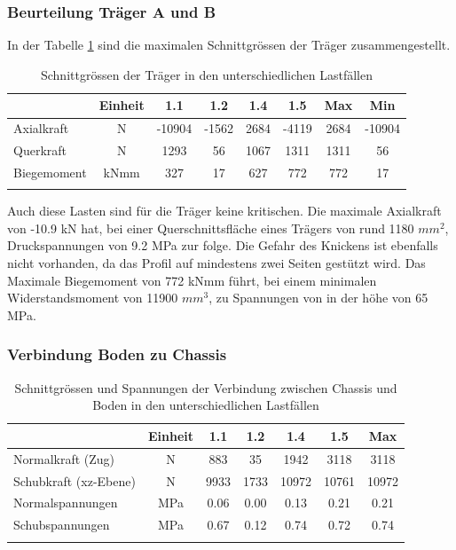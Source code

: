 \subsubsection{Beurteilung Träger A und B}
In der Tabelle \ref{tab:FEMres Träger} sind die maximalen Schnittgrössen der Träger zusammengestellt.
\begin{table}[H]
\centering
\begin{tabular}{lccccccc}
\thickhline
&	Einheit	&	1.1	&	1.2	&	1.4	&	1.5	&	Max	&	Min	\\	\hline
Axialkraft	&	N	&	-10904	&	-1562	&	2684	&	-4119	&	2684	&	-10904	\\
Querkraft	&	N	&	1293	&	56	&	1067	&	1311	&	1311	&	56	\\
Biegemoment	&	kNmm	&	327	&	17	&	627	&	772	&	772	&	17	\\	\thickhline
\end{tabular}
\caption{Schnittgrössen der Träger in den unterschiedlichen Lastfällen}
\label{tab:FEMres Träger}
\end{table}

Auch diese Lasten sind für die Träger keine kritischen. Die maximale Axialkraft von -10.9 kN hat, bei einer Querschnittsfläche eines Trägers von rund 1180 $mm^2$, Druckspannungen von 9.2 MPa zur folge. Die Gefahr des Knickens ist ebenfalls nicht vorhanden, da das Profil auf mindestens zwei Seiten gestützt wird. Das Maximale Biegemoment von 772 kNmm führt, bei einem minimalen Widerstandsmoment von 11900 $mm^3$, zu Spannungen von in der höhe von 65 MPa.



\subsubsection{Verbindung Boden zu Chassis}

\begin{table}[H]
\centering
\begin{tabular}{lcccccc}
\thickhline
&	Einheit	&	1.1	&	1.2	&	1.4	&	1.5	&	Max	\\	\hline
Normalkraft (Zug)	&	N	&	883	&	35	&	1942	&	3118	&	3118	\\
Schubkraft (xz-Ebene)	&	N	&	9933	&	1733	&	10972	&	10761	&	10972	\\	\hline
Normalspannungen	&	MPa	&	0.06	&	0.00	&	0.13	&	0.21	&	0.21	\\
Schubspannungen	&	MPa	&	0.67	&	0.12	&	0.74	&	0.72	&	0.74	\\	\thickhline
\end{tabular}
\caption{Schnittgrössen und Spannungen der Verbindung zwischen Chassis und Boden in den unterschiedlichen Lastfällen}
\label{tab:FEMres Boden}
\end{table}



